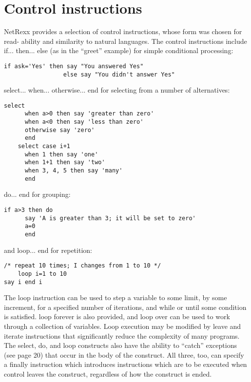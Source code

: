 \section{Control instructions}
NetRexx provides a selection of control instructions, whose form was
chosen for read- ability and similarity to natural languages. The
control instructions include if... then... else (as in the “greet”
example) for simple conditional processing:
\begin{lstlisting}[label=Conditional,caption=Conditional]
    if ask='Yes' then say "You answered Yes"
                 else say "You didn't answer Yes"
\end{lstlisting}
select... when... otherwise... end for selecting from a number of
alternatives:
\begin{lstlisting}[label=selectwhenotherwise,caption=select - when - otherwise]
    select
      when a>0 then say 'greater than zero'
      when a<0 then say 'less than zero'
      otherwise say 'zero'
      end
    select case i+1
      when 1 then say 'one'
      when 1+1 then say 'two'
      when 3, 4, 5 then say 'many'
      end
\end{lstlisting}
do... end for grouping:
\begin{lstlisting}[label=doend,caption=do - end]
    if a>3 then do
      say 'A is greater than 3; it will be set to zero'
      a=0
      end
\end{lstlisting}
and loop... end for repetition:
\begin{lstlisting}[label=loopend,caption=loop - end]
    /* repeat 10 times; I changes from 1 to 10 */
    loop i=1 to 10
say i end i
\end{lstlisting}
The loop instruction can be used to step a variable to some limit, by some increment, for a specified number of iterations, and while or until some condition is satisfied. loop forever is also provided, and loop over can be used to work through a collection of variables.
Loop execution may be modified by leave and iterate instructions that significantly reduce the complexity of many programs.
The select, do, and loop constructs also have the ability to “catch”
exceptions (see page 20) that occur in the body of the construct. All
three, too, can specify a finally instruction which introduces
instructions which are to be executed when control leaves the
construct, regardless of how the construct is ended.


